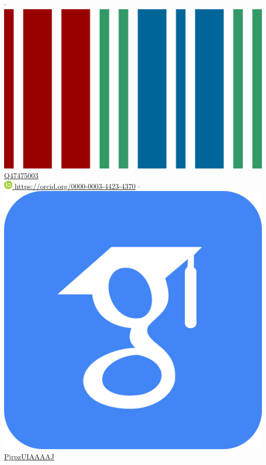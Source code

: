 \documentclass[11pt,a4paper,sans]{moderncv} %
\begin{document}
$\cdot$
\href{https://www.wikidata.org/wiki/Q47475003}{\includegraphics[scale=0.01]{img/wikidata_logo} Q47475003}
\\
\href{https://orcid.org/0000-0003-4423-4370}{\includegraphics[scale=0.5]{img/ORCIDiD_icon16x16} https://orcid.org/0000-0003-4423-4370}
$\cdot$
\href{https://scholar.google.com/citations?user=PjrpzUIAAAAJ&hl=en}{\includegraphics[scale=0.015625]{img/google_scholar_icon_130918} PjrpzUIAAAAJ}
\end{document}
